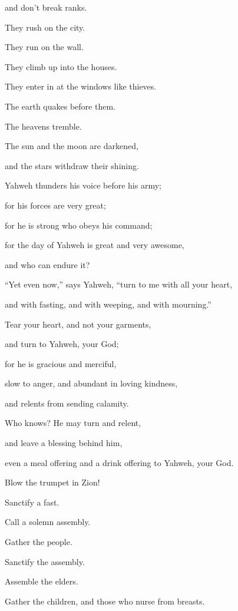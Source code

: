 {\par }{\QB and don’t break ranks.
\par }{\Q {}They rush on the city.
\par }{\QB They run on the wall.
\par }{\QB They climb up into the houses.
\par }{\QB They enter in at the windows like thieves.
\par }{\Q {}The earth quakes before them.
\par }{\QB The heavens tremble.
\par }{\QB The sun and the moon are darkened,
\par }{\QB and the stars withdraw their shining.
\par }{\Q {}Yahweh thunders his voice before his army;
\par }{\QB for his forces are very great;
\par }{\QB for he is strong who obeys his command;
\par }{\QB for the day of Yahweh is great and very awesome,
\par }{\QB and who can endure it?
\par }{\Q {}“Yet even now,” says Yahweh, “turn to me with all your heart,
\par }{\QB and with fasting, and with weeping, and with mourning.”
\par }{\Q {}Tear your heart, and not your garments,
\par }{\QB and turn to Yahweh, your God;
\par }{\QB for he is gracious and merciful,
\par }{\QB slow to anger, and abundant in loving kindness,
\par }{\QB and relents from sending calamity.
\par }{\Q {}Who knows? He may turn and relent,
\par }{\QB and leave a blessing behind him,
\par }{\QB even a meal offering and a drink offering to Yahweh, your God.
\par }{\Q {}Blow the trumpet in Zion!
\par }{\QB Sanctify a fast.
\par }{\QB Call a solemn assembly.
\par }{\Q {}Gather the people.
\par }{\QB Sanctify the assembly.
\par }{\QB Assemble the elders.
\par }{\QB Gather the children, and those who nurse from breasts.
}
